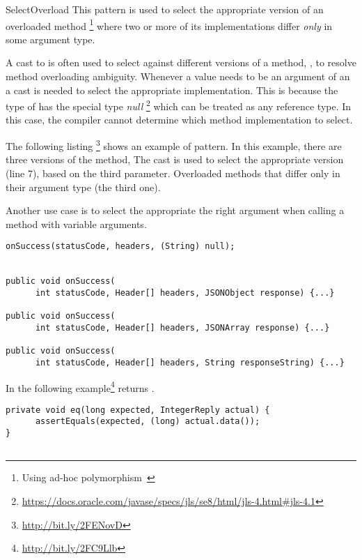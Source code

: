 \begin{pattern}{SelectOverload}
This pattern is used to select
the appropriate version of an overloaded method%
\footnote{Using ad-hoc polymorphism~\cite{stracheyFundamentalConceptsProgramming2000}}
where two or more of its implementations differ \emph{only} in some argument type.

A cast to  is often used to select against different versions
of a method, \ie{}, to resolve method overloading ambiguity.
Whenever a  value needs to be an argument of an a cast is
needed to select the appropriate implementation.
This is because the type of  has the special type \emph{null}%
\footnote{\url{https://docs.oracle.com/javase/specs/jls/se8/html/jls-4.html\#jls-4.1}}
which can be treated as any reference type.
In this case,
the compiler cannot determine which method implementation to select.

\instances{}
The following listing%
\footnote{\url{http://bit.ly/2FENovD}}
shows an example of \pname{} pattern.
In this example, there are three versions of the  method,
The cast  is used to select the appropriate version
(line 7), based on the third parameter.
Overloaded methods that differ only in their argument type (the third one).

Another use case is to select the appropriate the right argument when
calling a method with variable arguments.

\begin{verbatim}
onSuccess(statusCode, headers, (String) null);


public void onSuccess(
      int statusCode, Header[] headers, JSONObject response) {...}

public void onSuccess(
      int statusCode, Header[] headers, JSONArray response) {...}

public void onSuccess(
      int statusCode, Header[] headers, String responseString) {...}
\end{verbatim}

In the following example\footnote{\url{http://bit.ly/2FC9Llb}}
 returns .

\begin{verbatim}
private void eq(long expected, IntegerReply actual) {
      assertEquals(expected, (long) actual.data());
}


\end{verbatim}
\end{pattern}
